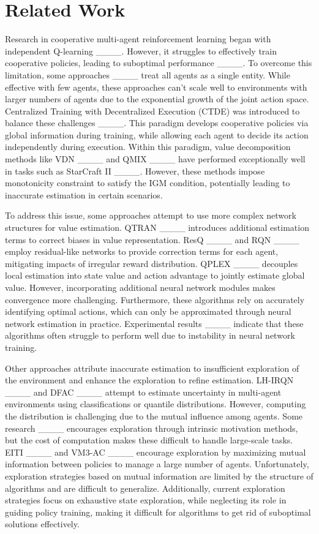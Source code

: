 \section{Related Work}
Research in cooperative multi-agent reinforcement learning began with independent Q-learning ____. However, it struggles to effectively train cooperative policies, leading to suboptimal performance ____. To overcome this limitation, some approaches ____ treat all agents as a single entity. While effective with few agents, these approaches can't scale well to environments with larger numbers of agents due to the exponential growth of the joint action space. Centralized Training with Decentralized Execution (CTDE) was introduced to balance these challenges ____. This paradigm develops cooperative policies via global information during training, while allowing each agent to decide its action independently during execution. Within this paradigm, value decomposition methods like VDN ____ and QMIX ____ have performed exceptionally well in tasks such as StarCraft II ____. However, these methods impose monotonicity constraint to satisfy the IGM condition, potentially leading to inaccurate estimation in certain scenarios.

To address this issue, some approaches attempt to use more complex network structures for value estimation. QTRAN ____ introduces additional estimation terms to correct biases in value representation. ResQ ____ and RQN ____ employ residual-like networks to provide correction terms for each agent, mitigating impacts of irregular reward distribution. QPLEX ____ decouples local estimation into state value and action advantage to jointly estimate global value. However, incorporating additional neural network modules makes convergence more challenging. Furthermore, these algorithms rely on accurately identifying optimal actions, which can only be approximated through neural network estimation in practice. Experimental results ____ indicate that these algorithms often struggle to perform well due to instability in neural network training.

Other approaches attribute inaccurate estimation to insufficient exploration of the environment and enhance the exploration to refine estimation. LH-IRQN 
____ and DFAC ____ attempt to estimate uncertainty in multi-agent environments using classifications or quantile distributions. However, computing the distribution is challenging due to the mutual influence among agents. Some research ____ encourages exploration through intrinsic motivation methods, but the cost of computation makes these difficult to handle large-scale tasks. EITI ____ and VM3-AC ____ encourage exploration by maximizing mutual information between policies to manage a large number of agents. Unfortunately, exploration strategies based on mutual information are limited by the structure of algorithms and are difficult to generalize. Additionally, current exploration strategies focus on exhaustive state exploration, while neglecting its role in guiding policy training, making it difficult for algorithms to get rid of suboptimal solutions effectively.

